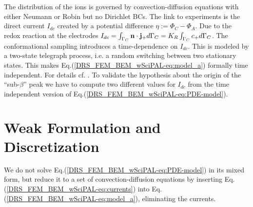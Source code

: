 \documentclass[runningheads]{lncse}
\newcommand{\mydiff}[2]{{}{#2}}
\begin{document}
%
The distribution of the 
ions 
is governed by convection-diffusion equations with either Neumann or Robin but no Dirichlet BCs.
%
The link to experiments is 
the direct current $I_{dc}$ created by a potential difference $\eta := \Phi_C - \Phi_A$.
%
Due to the redox reaction at the electrodes
% 
$
I_{dc} 
=
 \int_{\Gamma_C}  {\bf n} \cdot{\bf j}_+ d\Gamma_C
  =
   K_R \int_{\Gamma_C}  c_+ d\Gamma_C$. %
%
The conformational sampling introduces a time-dependence on $I_{dc}$. 
%
This is modeled by a two-state telegraph process,
%
\mydiff{}{ %
i.e. a random
switching between two stationary states.
This makes Eq.(\ref{DRS_FEM_BEM_wSciPAL-eq:model_a}) formally time independent. For details cf. \cite{kramer2012cuda}.}
%
To validate the hypothesis about the origin of the ``sub-$\beta$'' peak we 
have to compute two different values for $I_{dc}$ from the time independent version of Eq.(\ref{DRS_FEM_BEM_wSciPAL-eq:PDE-model}).


\section{Weak Formulation and Discretization}
\label{DRS_FEM_BEM_wSciPAL-sec:drs-fem-bem-weak-form}

\mydiff{}{
We do not solve Eq.(\ref{DRS_FEM_BEM_wSciPAL-eq:PDE-model}) in its mixed form, but reduce it to a set of convection-diffusion equations by inserting Eq.(\ref{DRS_FEM_BEM_wSciPAL-eq:currents}) into Eq.(\ref{DRS_FEM_BEM_wSciPAL-eq:model_a}), eliminating the currents.
}
\end{document}
